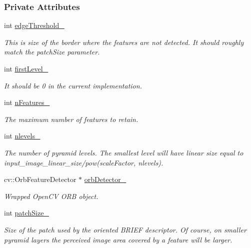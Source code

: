 \subsubsection*{Private Attributes}
\begin{DoxyCompactItemize}
\item 
int \hyperlink{group___feature_extractor_af74609fa7b56d5dea19c9460f42b25ab}{edge\-Threshold\-\_\-}
\begin{DoxyCompactList}\small\item\em This is size of the border where the features are not detected. It should roughly match the patch\-Size parameter. \end{DoxyCompactList}\item 
int \hyperlink{group___feature_extractor_a1c1e186a9f2bc54c38f54f3c1e8f7d0f}{first\-Level\-\_\-}
\begin{DoxyCompactList}\small\item\em It should be 0 in the current implementation. \end{DoxyCompactList}\item 
int \hyperlink{group___feature_extractor_a8fb8ef05ff3dff5ffee90c6f41e83cb2}{n\-Features\-\_\-}
\begin{DoxyCompactList}\small\item\em The maximum number of features to retain. \end{DoxyCompactList}\item 
int \hyperlink{group___feature_extractor_abfb07330bd1a63270f935e1317111300}{nlevels\-\_\-}
\begin{DoxyCompactList}\small\item\em The number of pyramid levels. The smallest level will have linear size equal to input\-\_\-image\-\_\-linear\-\_\-size/pow(scale\-Factor, nlevels). \end{DoxyCompactList}\item 
cv\-::\-Orb\-Feature\-Detector $\ast$ \hyperlink{group___feature_extractor_afbddce112b372099591a6ec049aff0f5}{orb\-Detector\-\_\-}
\begin{DoxyCompactList}\small\item\em Wrapped Open\-C\-V O\-R\-B object. \end{DoxyCompactList}\item 
int \hyperlink{group___feature_extractor_ae7f8a68d8b86f650348bc213c43f593a}{patch\-Size\-\_\-}
\begin{DoxyCompactList}\small\item\em Size of the patch used by the oriented B\-R\-I\-E\-F descriptor. Of course, on smaller pyramid layers the perceived image area covered by a feature will be larger. \end{DoxyCompactList}\item 

\end{DoxyCompactItemize}
